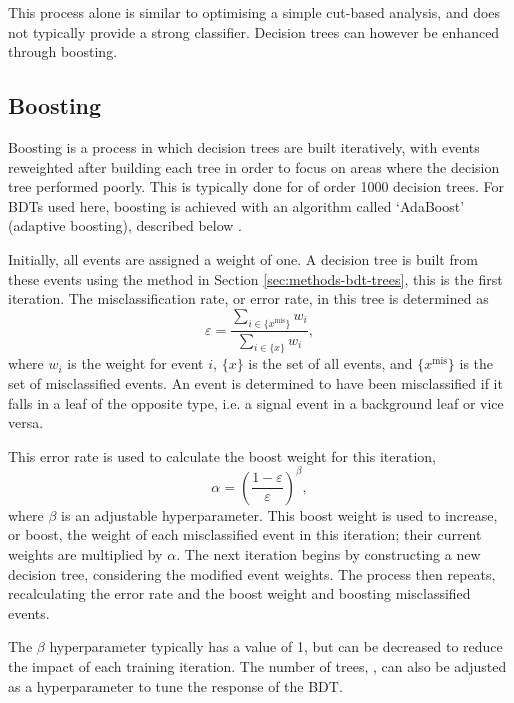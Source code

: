 This process alone is similar to optimising a simple cut-based analysis, and
does not typically provide a strong classifier. Decision trees can however be
enhanced through boosting.

\subsection{Boosting}

Boosting is a process in which decision trees are built iteratively, with
events reweighted after building each tree in order to focus on areas where the
decision tree performed poorly. This is typically done for of order 1000
decision trees. For \acp{BDT} used here, boosting is achieved with an algorithm
called `AdaBoost' (adaptive boosting), described below \cite{TMVAguide}.

Initially, all events are assigned a weight of one. A decision tree is built
from these events using the method in Section \ref{sec:methods-bdt-trees}, this
is the first iteration. The misclassification rate, or error rate, in this tree
is determined as
\begin{equation*}
  \varepsilon = \frac{ \sum_{i\in\{x^\text{mis}\}} w_i }
                     { \sum_{i\in\{x\}} w_i },
\end{equation*}
where $w_i$ is the weight for event $i$, $\{x\}$ is the set of all events, and
$\{x^\text{mis}\}$ is the set of misclassified events. An event is determined to
have been misclassified if it falls in a leaf of the opposite type, i.e. a
signal event in a background leaf or vice versa.

This error rate is used to calculate the boost weight for this iteration,
\begin{equation*}
  \alpha = \left( \frac{1-\varepsilon}{\varepsilon} \right) ^\beta,
\end{equation*}
where $\beta$ is an adjustable hyperparameter. This boost weight is used to
increase, or boost, the weight of each misclassified event in this iteration;
their current weights are multiplied by $\alpha$.
The next iteration begins by constructing a new decision tree, considering the
modified event weights. The process then repeats, recalculating the error rate
and the boost weight and boosting misclassified events.

The $\beta$ hyperparameter typically has a value of 1, but can be decreased to
reduce the impact of each training iteration. The number of trees, \ntrees, can
also be adjusted as a hyperparameter to tune the response of the \ac{BDT}.

